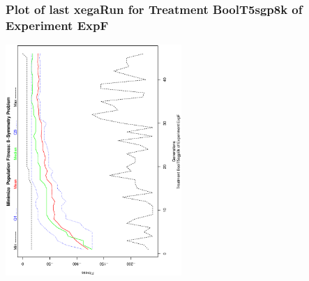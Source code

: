  \begin{frame}
 \frametitle{ Plot of last xegaRun for Treatment BoolT5sgp8k of Experiment ExpF }
 \begin{center}
\includegraphics[width=0.5\textwidth, angle=-90]
{ExpFPlotPopStatsFigure009.eps}
 \end{center}
 \label{report/ExpFPlotPopStatsFigure009.eps}  
 \end{frame}

